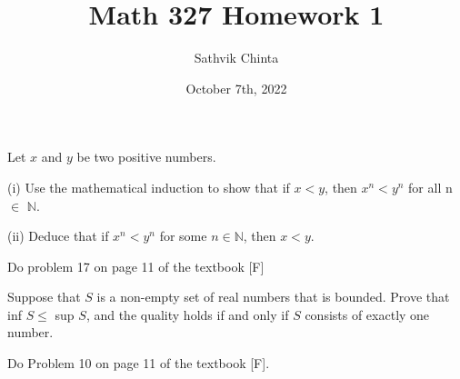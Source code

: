 \documentclass[addpoints]{exam}
\title{Math 327 Homework 1}
\author{Sathvik Chinta}
\date{October 7th, 2022}
\begin{document}
\maketitle

\begin{questions}
\question Let $x$ and $y$ be two positive numbers. 

(i) Use the mathematical induction to show that if $x < y$, then $x^n < y^n$ for all
n $\in$ $\mathbb{N}$.

(ii) Deduce that if $x^n < y^n$ for some $n \in \mathbb{N}$, then $x < y$.

\question Do problem 17 on page 11 of the textbook [F]

\question Suppose that $S$ is a non-empty set of real numbers that is bounded. Prove
that inf $S \leq$ sup $S$, and the quality holds if and only if $S$ consists of exactly
one number.

\quesiton Do Problem 10 on page 11 of the textbook [F].

\end{questions}
\end{document}
